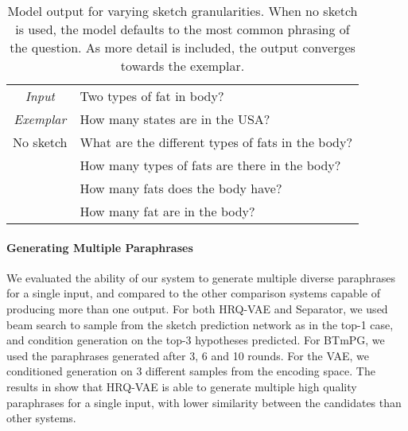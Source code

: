 \documentclass[11pt]{article}
\begin{document}
\begin{table}[t]
\small
    \centering
    \begin{tabular}{@{~}c@{~}|@{~}p{5.9cm}@{}}
    
\hline \hline
    \textit{Input} & Two types of fat in body? \\
    \textit{Exemplar} & How many states are in the USA? \\
    \hline
    No sketch & What are the different types of fats in the body?  \\
     & How many types of fats are there in the body? \\
     & How many fats does the body have? \\
     & How many fat are in the body? \\
    \hline
    \hline
    \end{tabular}
\caption{Model output for varying sketch granularities. When no sketch is used, the model defaults to the most common phrasing of the question. As more detail is included, the output converges towards the exemplar.}
\label{tab:maskedexample}
\end{table}


\paragraph{Generating Multiple Paraphrases} We evaluated the ability of our system to generate multiple diverse paraphrases for a single input, and compared to the other comparison systems capable of producing more than one output. For both HRQ-VAE and Separator, we used beam search to sample from the sketch prediction network as in the top-1 case, and condition generation on the top-3 hypotheses predicted. For BTmPG, we used the paraphrases generated after 3, 6 and 10 rounds. For the VAE, we conditioned generation on 3 different samples from the encoding space. The results in  show that HRQ-VAE is able to generate multiple high quality paraphrases for a single input, with lower similarity between the candidates than other systems.
\end{document}
